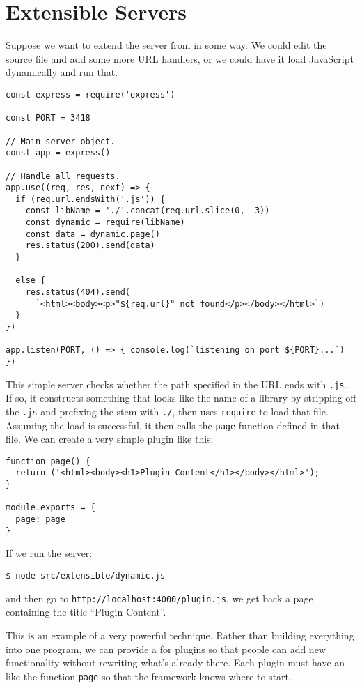 \chapter{Extensible Servers}\label{s:extensible}

Suppose we want to extend the server from  in some way.
We could edit the source file and add some more URL handlers,
or we could have it load JavaScript dynamically and run that.

\begin{verbatim}
const express = require('express')

const PORT = 3418

// Main server object.
const app = express()

// Handle all requests.
app.use((req, res, next) => {
  if (req.url.endsWith('.js')) {
    const libName = './'.concat(req.url.slice(0, -3))
    const dynamic = require(libName)
    const data = dynamic.page()
    res.status(200).send(data)
  }

  else {
    res.status(404).send(
      `<html><body><p>"${req.url}" not found</p></body></html>`)
  }
})

app.listen(PORT, () => { console.log(`listening on port ${PORT}...`) })
\end{verbatim}

This simple server checks whether the path specified in the URL ends with \texttt{.js}.
If so,
it constructs something that looks like the name of a library by stripping off the \texttt{.js}
and prefixing the stem with \texttt{./},
then uses \texttt{require} to load that file.
Assuming the load is successful,
it then calls the \texttt{page} function defined in that file.
We can create a very simple plugin like this:

\begin{verbatim}
function page() {
  return ('<html><body><h1>Plugin Content</h1></body></html>');
}

module.exports = {
  page: page
}
\end{verbatim}

If we run the server:

\begin{verbatim}
$ node src/extensible/dynamic.js
\end{verbatim}

\noindent
and then go to \texttt{http://localhost:4000/plugin.js},
we get back a page containing the title ``Plugin Content''.

This is an example of a very powerful technique.
Rather than building everything into one program,
we can provide a  for plugins
so that people can add new functionality without rewriting what's already there.
Each plugin must have an  like the function \texttt{page}
so that the framework knows where to start.
